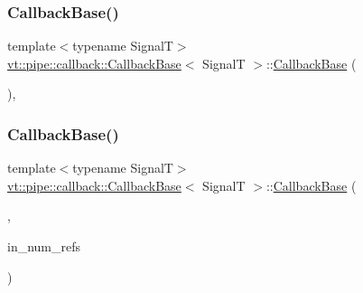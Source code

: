 \subsubsection{\texorpdfstring{Callback\+Base()}{CallbackBase()}\hspace{0.1cm}{\footnotesize\ttfamily [5/7]}}
{\footnotesize\ttfamily template$<$typename SignalT$>$ \\
\hyperlink{structvt_1_1pipe_1_1callback_1_1_callback_base}{vt\+::pipe\+::callback\+::\+Callback\+Base}$<$ SignalT $>$\+::\hyperlink{structvt_1_1pipe_1_1callback_1_1_callback_base}{Callback\+Base} (\begin{DoxyParamCaption}\item[{Callback\+Single\+Use\+Tag\+Type}]{ }\end{DoxyParamCaption})\hspace{0.3cm}{\ttfamily [inline]}, {\ttfamily [explicit]}}

\mbox{\label{structvt_1_1pipe_1_1callback_1_1_callback_base_a87a0d70f0b3a7c8d94eb62c278ba9e0e}} 
\subsubsection{\texorpdfstring{Callback\+Base()}{CallbackBase()}\hspace{0.1cm}{\footnotesize\ttfamily [6/7]}}
{\footnotesize\ttfamily template$<$typename SignalT$>$ \\
\hyperlink{structvt_1_1pipe_1_1callback_1_1_callback_base}{vt\+::pipe\+::callback\+::\+Callback\+Base}$<$ SignalT $>$\+::\hyperlink{structvt_1_1pipe_1_1callback_1_1_callback_base}{Callback\+Base} (\begin{DoxyParamCaption}\item[{Callback\+Multi\+Use\+Tag\+Type}]{,  }\item[{\hyperlink{namespacevt_a9b39ce9494bb04674d0d5b895a5aa50f}{Ref\+Type} const \&}]{in\+\_\+num\+\_\+refs }\end{DoxyParamCaption})\hspace{0.3cm}{\ttfamily [inline]}}

\mbox{\label{structvt_1_1pipe_1_1callback_1_1_callback_base_a182bd31e2c3f804bb61a4b43907061d2}} 
